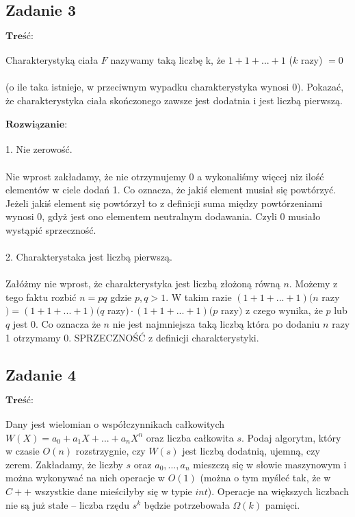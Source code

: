 \subsection{Zadanie 3}

$\textbf{Treść:}$  \\
\\
Charakterystyką ciała $F$ nazywamy taką liczbę k, że $1 + 1 + . . . + 1$ ($k$ razy) $ = 0$ \\ \\
(o ile taka istnieje, w przeciwnym wypadku charakterystyka wynosi $0$). Pokazać, że
charakterystyka ciała skończonego zawsze jest dodatnia i jest liczbą pierwszą.
\\ \\
$\textbf{Rozwiązanie:}$ \\ \\
1. Nie zerowość. \\ \\
Nie wprost zakładamy, że nie otrzymujemy 0 a wykonaliśmy więcej niz ilość elementów w ciele dodań 1. Co oznacza, że jakiś element musiał się powtórzyć. Jeżeli jakiś element się powtórzył to z definicji suma między powtórzeniami wynosi 0, gdyż jest ono elementem neutralnym dodawania. Czyli 0 musiało wystąpić sprzeczność.
\\
\\
2. Charakterystaka jest liczbą pierwszą.\\ \\
Załóżmy nie wprost, że charakterystyka jest liczbą złożoną równą $n$. Możemy z tego faktu rozbić $n = pq$ gdzie $p,q > 1$. W takim razie $(1+1+...+1) (n$ razy$) = (1+1+...+1) (q$ razy$) \cdot (1+1+...+1) (p$ razy$)$ z czego wynika, że $p$ lub $q$ jest 0. Co oznacza że $n$ nie jest najmniejsza taką liczbą która po dodaniu $n$ razy 1 otrzymamy 0. SPRZECZNOŚĆ z definicji charakterystyki.

\subsection{Zadanie 4}

$\textbf{Treść:}$  \\
\\
Dany jest wielomian o współczynnikach całkowitych $W(X) = a_0 + a_1X +
	... + a_nX^n$ oraz liczba całkowita $s$. Podaj algorytm, który w czasie $O(n)$ rozstrzygnie,
czy $W(s)$ jest liczbą dodatnią, ujemną, czy zerem.
Zakładamy, że liczby $s$ oraz $a_0, ..., a_n$ mieszczą się w słowie maszynowym i można
wykonywać na nich operacje w $O(1)$ (można o tym myśleć tak, że w $C++$ wszystkie dane
mieściłyby się w typie $int$). Operacje na większych liczbach nie są już stałe – liczba rzędu
$s^k$
będzie potrzebowała $\Omega(k)$ pamięci.


